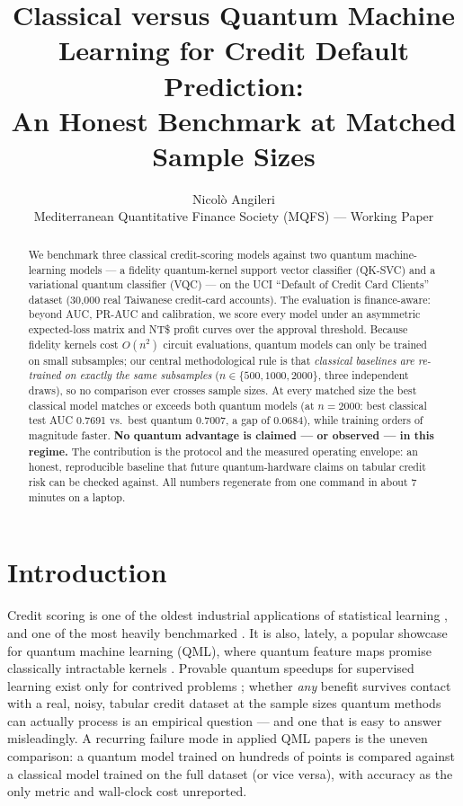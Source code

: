 \documentclass[11pt]{article}
\title{Classical versus Quantum Machine Learning for Credit Default
Prediction:\\ An Honest Benchmark at Matched Sample Sizes}
\author{Nicol\`o Angileri\\
\small Mediterranean Quantitative Finance Society (MQFS) --- Working Paper}
\date{}
\begin{document}
\maketitle

\begin{abstract}
\noindent We benchmark three classical credit-scoring models against two
quantum machine-learning models --- a fidelity quantum-kernel support vector
classifier (QK-SVC) and a variational quantum classifier (VQC) --- on the UCI
``Default of Credit Card Clients'' dataset (30{,}000 real Taiwanese
credit-card accounts). The evaluation is finance-aware: beyond AUC, PR-AUC and
calibration, we score every model under an asymmetric expected-loss matrix and
NT\$ profit curves over the approval threshold. Because fidelity kernels cost
$O(n^2)$ circuit evaluations, quantum models can only be trained on small
subsamples; our central methodological rule is that \emph{classical baselines
are re-trained on exactly the same subsamples} ($n \in \{500, 1000, 2000\}$, three
independent draws), so no comparison ever crosses sample sizes. At every
matched size the best classical model matches or exceeds both quantum models
(at $n=2000$: best classical test AUC 0.7691 vs.\ best quantum
0.7007, a gap of 0.0684), while training orders of magnitude faster.
\textbf{No quantum advantage is claimed --- or observed --- in this regime.}
The contribution is the protocol and the measured operating envelope: an
honest, reproducible baseline that future quantum-hardware claims on tabular
credit risk can be checked against. All numbers regenerate from one command in
about 7 minutes on a laptop.
\end{abstract}

\section{Introduction}
Credit scoring is one of the oldest industrial applications of statistical
learning \cite{hand1997,thomas2002}, and one of the most heavily benchmarked
\cite{lessmann2015}. It is also, lately, a popular showcase for quantum
machine learning (QML), where quantum feature maps promise classically
intractable kernels \cite{havlicek2019,schuld2019}. Provable quantum speedups
for supervised learning exist only for contrived problems
\cite{liu2021}; whether \emph{any} benefit survives contact with a real,
noisy, tabular credit dataset at the sample sizes quantum methods can actually
process is an empirical question --- and one that is easy to answer
misleadingly. A recurring failure mode in applied QML papers is the uneven
comparison: a quantum model trained on hundreds of points is compared against
a classical model trained on the full dataset (or vice versa), with accuracy
as the only metric and wall-clock cost unreported.
\end{document}
